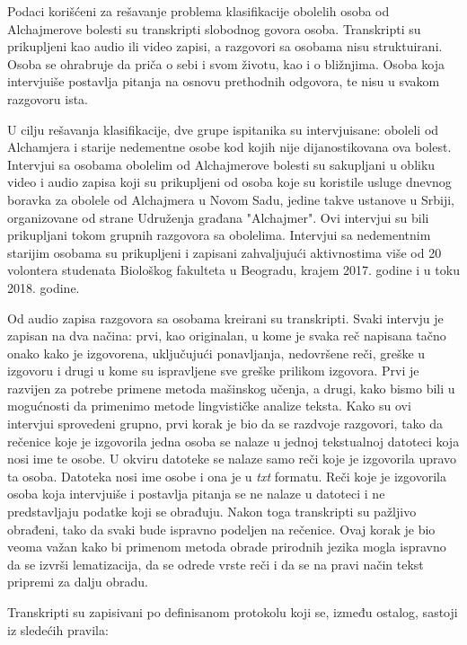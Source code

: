 \documentclass[12pt,oneside]{memoir}
\begin{document}
Podaci korišćeni za rešavanje problema klasifikacije obolelih osoba od Alchajmerove bolesti su transkripti slobodnog govora osoba. Transkripti su prikupljeni kao audio ili video zapisi, a razgovori sa osobama nisu struktuirani. Osoba se ohrabruje da priča o sebi i svom životu, kao i o bližnjima. Osoba koja intervjuiše postavlja pitanja na osnovu prethodnih odgovora, te nisu u svakom razgovoru ista.

U cilju rešavanja klasifikacije, dve grupe ispitanika su intervjuisane: oboleli od Alchamjera i starije nedementne osobe kod kojih nije dijanostikovana ova bolest. Intervjui sa osobama obolelim od Alchajmerove bolesti su sakupljani u obliku video i audio zapisa koji su prikupljeni od osoba koje su koristile usluge dnevnog boravka za obolele od Alchajmera u Novom Sadu, jedine takve ustanove u Srbiji, organizovane od strane Udruženja građana "Alchajmer". Ovi intervjui su bili prikupljani tokom grupnih razgovora sa obolelima. 
\newline
\newline
Intervjui sa nedementnim starijim osobama su prikupljeni i zapisani zahvaljujući aktivnostima više od 20 volontera studenata Biološkog fakulteta u Beogradu, krajem 2017. godine i u toku 2018. godine.

Od audio zapisa razgovora sa osobama kreirani su transkripti. Svaki intervju je zapisan na dva načina: prvi, kao originalan, u kome je svaka reč napisana tačno onako kako je izgovorena, uključujući ponavljanja, nedovršene reči, greške u izgovoru i drugi u kome su ispravljene sve greške prilikom izgovora. Prvi je razvijen za potrebe primene metoda mašinskog učenja, a drugi, kako bismo bili u mogućnosti da primenimo metode lingvističke analize teksta. Kako su ovi intervjui sprovedeni grupno, prvi korak je bio da se razdvoje razgovori, tako da rečenice koje je izgovorila jedna osoba se nalaze u jednoj tekstualnoj datoteci koja nosi ime te osobe. U okviru datoteke se nalaze samo reči koje je izgovorila upravo ta osoba. Datoteka nosi ime osobe i ona je u \textit{txt} formatu.  Reči koje je izgovorila osoba koja intervjuiše i postavlja pitanja se ne nalaze u datoteci i ne predstavljaju podatke koji se obrađuju. Nakon toga transkripti su pažljivo obrađeni, tako da svaki bude ispravno podeljen na rečenice. Ovaj korak je bio veoma važan kako bi primenom metoda obrade prirodnih jezika mogla ispravno da se izvrši lematizacija, da se odrede vrste reči i da se na pravi način tekst pripremi za dalju obradu.

Transkripti su zapisivani po definisanom protokolu koji se, između ostalog, sastoji iz sledećih pravila:
\end{document}
